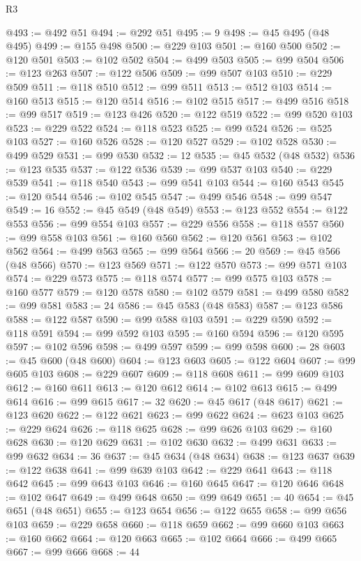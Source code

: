 \begin{lexlean}{R3}
\begin{coremodule}
@493 := @492 @51
@494 := @292 @51
@495 := 9
@498 := @45 @495 (@48 @495)
@499 := @155 @498
@500 := @229 @103
@501 := @160 @500
@502 := @120 @501
@503 := @102 @502
@504 := @499 @503
@505 := @99 @504
@506 := @123 @263
@507 := @122 @506
@509 := @99 @507 @103
@510 := @229 @509
@511 := @118 @510
@512 := @99 @511
@513 := @512 @103
@514 := @160 @513
@515 := @120 @514
@516 := @102 @515
@517 := @499 @516
@518 := @99 @517
@519 := @123 @426
@520 := @122 @519
@522 := @99 @520 @103
@523 := @229 @522
@524 := @118 @523
@525 := @99 @524
@526 := @525 @103
@527 := @160 @526
@528 := @120 @527
@529 := @102 @528
@530 := @499 @529
@531 := @99 @530
@532 := 12
@535 := @45 @532 (@48 @532)
@536 := @123 @535
@537 := @122 @536
@539 := @99 @537 @103
@540 := @229 @539
@541 := @118 @540
@543 := @99 @541 @103
@544 := @160 @543
@545 := @120 @544
@546 := @102 @545
@547 := @499 @546
@548 := @99 @547
@549 := 16
@552 := @45 @549 (@48 @549)
@553 := @123 @552
@554 := @122 @553
@556 := @99 @554 @103
@557 := @229 @556
@558 := @118 @557
@560 := @99 @558 @103
@561 := @160 @560
@562 := @120 @561
@563 := @102 @562
@564 := @499 @563
@565 := @99 @564
@566 := 20
@569 := @45 @566 (@48 @566)
@570 := @123 @569
@571 := @122 @570
@573 := @99 @571 @103
@574 := @229 @573
@575 := @118 @574
@577 := @99 @575 @103
@578 := @160 @577
@579 := @120 @578
@580 := @102 @579
@581 := @499 @580
@582 := @99 @581
@583 := 24
@586 := @45 @583 (@48 @583)
@587 := @123 @586
@588 := @122 @587
@590 := @99 @588 @103
@591 := @229 @590
@592 := @118 @591
@594 := @99 @592 @103
@595 := @160 @594
@596 := @120 @595
@597 := @102 @596
@598 := @499 @597
@599 := @99 @598
@600 := 28
@603 := @45 @600 (@48 @600)
@604 := @123 @603
@605 := @122 @604
@607 := @99 @605 @103
@608 := @229 @607
@609 := @118 @608
@611 := @99 @609 @103
@612 := @160 @611
@613 := @120 @612
@614 := @102 @613
@615 := @499 @614
@616 := @99 @615
@617 := 32
@620 := @45 @617 (@48 @617)
@621 := @123 @620
@622 := @122 @621
@623 := @99 @622
@624 := @623 @103
@625 := @229 @624
@626 := @118 @625
@628 := @99 @626 @103
@629 := @160 @628
@630 := @120 @629
@631 := @102 @630
@632 := @499 @631
@633 := @99 @632
@634 := 36
@637 := @45 @634 (@48 @634)
@638 := @123 @637
@639 := @122 @638
@641 := @99 @639 @103
@642 := @229 @641
@643 := @118 @642
@645 := @99 @643 @103
@646 := @160 @645
@647 := @120 @646
@648 := @102 @647
@649 := @499 @648
@650 := @99 @649
@651 := 40
@654 := @45 @651 (@48 @651)
@655 := @123 @654
@656 := @122 @655
@658 := @99 @656 @103
@659 := @229 @658
@660 := @118 @659
@662 := @99 @660 @103
@663 := @160 @662
@664 := @120 @663
@665 := @102 @664
@666 := @499 @665
@667 := @99 @666
@668 := 44

\end{coremodule}
\end{lexlean}
